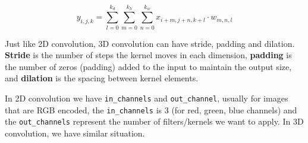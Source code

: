 \begin{equation*}
    y_{i,j,k} = \sum_{l=0}^{k_d} \sum_{m=0}^{k_h} \sum_{n=0}^{k_w} x_{i+m,j+n,k+l} \cdot w_{m,n,l}
\end{equation*}

Just like 2D convolution, 3D convolution can have stride, padding and dilation. \textbf{Stride} is the number of steps the kernel moves in each dimension, \textbf{padding} is the number of zeros (padding) added to the input to maintain the output size, and \textbf{dilation} is the spacing between kernel elements.

In 2D convolution we have \texttt{in\_channels} and \texttt{out\_channel}, usually for images that are RGB encoded, the \texttt{in\_channels} is 3 (for red, green, blue channels) and the \texttt{out\_channels} represent the number of filters/kernels we want to apply. In 3D convolution, we have similar situation. 

